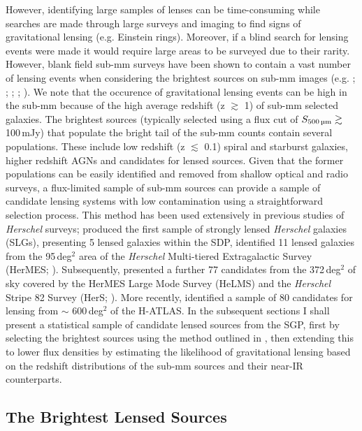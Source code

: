 However, identifying large samples of lenses can be time-consuming while searches are made through large surveys and imaging to find signs of gravitational lensing (e.g. Einstein rings). Moreover, if a blind search for lensing events were made it would require large areas to be surveyed due to their rarity. However, blank field sub-mm surveys have been shown to contain a vast number of lensing events when considering the brightest sources on sub-mm images (e.g. \citealt{Blain_1996}; \citealt{Perrotta_2002}; \citealt{Negrello_2007}; \citealt{Paciga_2009}; \citealt{Bakx_2020}). We note that the occurence of gravitational lensing events can be high in the sub-mm because of the high average redshift (z $\gtrsim$ 1) of sub-mm selected galaxies. The brightest sources (typically selected using a flux cut of $S_{\textrm{500\,\micron}} \gtrsim$ 100\,mJy) that populate the bright tail of the sub-mm counts contain several populations. These include low redshift (z $\lesssim$ 0.1) spiral and starburst galaxies, higher redshift AGNs and candidates for lensed sources. Given that the former populations can be easily identified and removed from shallow optical and radio surveys, a flux-limited sample of sub-mm sources can provide a sample of candidate lensing systems with low contamination using a straightforward selection process. This method has been used extensively in previous studies of \textit{Herschel} surveys; \citealt{Negrello_2010} produced the first sample of strongly lensed \textit{Herschel} galaxies (SLGs), presenting 5 lensed galaxies within the SDP, \citealt{Wardlow_2013} identified 11 lensed galaxies from the 95\,deg$^{2}$ area of the \textit{Herschel} Multi-tiered Extragalactic Survey (HerMES; \citealt{Oliver_2012}). Subsequently, \citealt{Nayyeri_2016} presented a further 77 candidates from the 372\,deg$^{2}$ of sky covered by the HerMES Large Mode Survey (HeLMS) and the \textit{Herschel} Stripe 82 Survey (HerS; \citealt{Viero_2014}). More recently, \citealt{Negrello_2017} identified a sample of 80 candidates for lensing from $\sim$ 600\,deg$^{2}$ of the H-ATLAS. In the subsequent sections I shall present a statistical sample of candidate lensed sources from the SGP, first by selecting the brightest sources using the method outlined in \citealt{Negrello_2017}, then extending this to lower flux densities by estimating the likelihood of gravitational lensing based on the redshift distributions of the sub-mm sources and their near-IR counterparts. 

\subsection{The Brightest Lensed Sources}
\label{sec:brightest_lenses}


